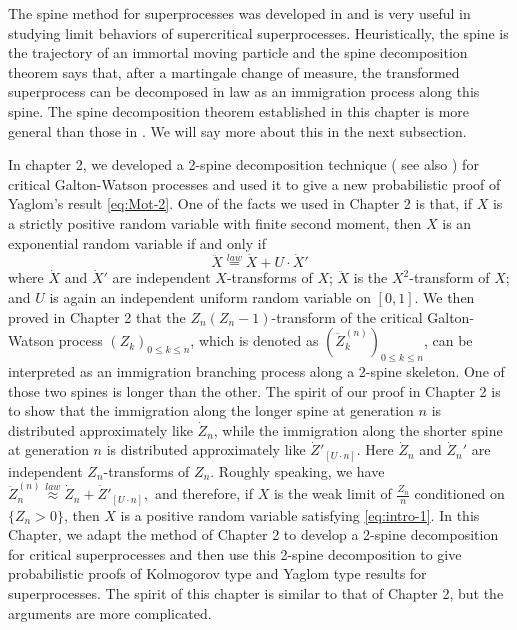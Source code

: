 \documentclass[UTF8]{pkuthss}
\theoremstyle{plain}
\theoremstyle{definition}
\numberwithin{equation}{section}
\begin{document}
The spine method for superprocesses was
	developed in \cite{EckhoffKyprianouWinkel2015Spines, EnglanderKyprianou2004Local, LiuRenSong2009Log} and is very useful in studying limit behaviors of supercritical superprocesses.
	Heuristically, the spine is the trajectory of an immortal moving particle and the spine decomposition theorem says that, after a martingale change of measure, the transformed superprocess can be decomposed in law as an immigration process along this spine.
	The spine decomposition theorem established in this chapter is more general than those in \cite{EckhoffKyprianouWinkel2015Spines, EnglanderKyprianou2004Local, LiuRenSong2009Log}.
   We will say more about this in the next subsection.

	In chapter 2, we developed a 2-spine decomposition technique ( see also \cite{RenSongSun20182spine}) for critical Galton-Watson processes
	and used it to give a new probabilistic proof of Yaglom's result \eqref{eq:Mot-2}.
	One of the facts we used in Chapter 2 is that, if $X$ is a strictly positive random variable with finite second moment,
	then $X$ is an exponential random variable if and only if
\begin{equation}\label{eq:intro-1}
	\ddot X
	\overset{law}{=} \dot X + U \cdot \dot X'
\end{equation}
	where $\dot X$ and $\dot X'$ are independent $X$-transforms of $X$;
	$\ddot X$ is the $X^2$-transform of $X$;
	and $U$ is again an independent uniform random variable on $[0,1]$.
	We then proved in Chapter 2 that the $Z_n(Z_n-1)$-transform of the critical Galton-Watson process $(Z_k)_{0\leq k\leq n}$, which is denoted as $(\ddot Z_k^{(n)})_{0\leq k\leq n}$, can be interpreted as an immigration branching process along a 2-spine skeleton.
	One of those two spines is longer than the other.
	The spirit of our proof in Chapter 2 is to show that the immigration along the longer spine at generation $n$ is distributed approximately like $\dot Z_n$, while the immigration along the shorter spine at generation $n$ is distributed approximately like $\dot Z'_{[U\cdot n]}$.
	Here $\dot Z_n$ and $\dot Z_n'$ are independent $Z_n$-transforms of $Z_n$.
	Roughly speaking, we have
$
	\ddot Z_n^{(n)}
	\overset{law}{\approx} \dot Z_n + \dot Z'_{[U\cdot n]},
$
	and therefore, if $X$ is the weak limit of $\frac{Z_n}{n}$ conditioned on $\{Z_n>0\}$, then $X$ is a positive random variable satisfying \eqref{eq:intro-1}.
In this Chapter, we adapt the method of Chapter 2 to develop a 2-spine
decomposition for critical superprocesses and then use this 2-spine decomposition to give
probabilistic proofs of Kolmogorov type and Yaglom type results for superprocesses. The spirit of this chapter is similar to that of Chapter 2, but the arguments are more
complicated.
\end{document}
